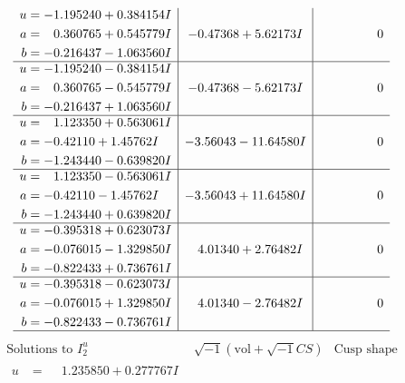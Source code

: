 \documentclass[1p]{elsarticle_modified}
\theoremstyle{definition}
\newcommand{\I}{\sqrt{-1}}
\begin{document}
$$\begin{array}{c|c|c}
\begin{aligned}
u &= -1.195240 + 0.384154 I \\
a &= \phantom{-}0.360765 + 0.545779 I \\
b &= -0.216437 - 1.063560 I\end{aligned}
 & -0.47368 + 5.62173 I & \phantom{-0.000000 } 0 \\ \hline\begin{aligned}
u &= -1.195240 - 0.384154 I \\
a &= \phantom{-}0.360765 - 0.545779 I \\
b &= -0.216437 + 1.063560 I\end{aligned}
 & -0.47368 - 5.62173 I & \phantom{-0.000000 } 0 \\ \hline\begin{aligned}
u &= \phantom{-}1.123350 + 0.563061 I \\
a &= -0.42110 + 1.45762 I \\
b &= -1.243440 - 0.639820 I\end{aligned}
 & -3.56043 - 11.64580 I & \phantom{-0.000000 } 0 \\ \hline\begin{aligned}
u &= \phantom{-}1.123350 - 0.563061 I \\
a &= -0.42110 - 1.45762 I \\
b &= -1.243440 + 0.639820 I\end{aligned}
 & -3.56043 + 11.64580 I & \phantom{-0.000000 } 0 \\ \hline\begin{aligned}
u &= -0.395318 + 0.623073 I \\
a &= -0.076015 - 1.329850 I \\
b &= -0.822433 + 0.736761 I\end{aligned}
 & \phantom{-}4.01340 + 2.76482 I & \phantom{-0.000000 } 0 \\ \hline\begin{aligned}
u &= -0.395318 - 0.623073 I \\
a &= -0.076015 + 1.329850 I \\
b &= -0.822433 - 0.736761 I\end{aligned}
 & \phantom{-}4.01340 - 2.76482 I & \phantom{-0.000000 } 0\\
 \hline 
 \end{array}$$\newpage$$\begin{array}{c|c|c}  
\text{Solutions to }I^u_{2}& \I (\text{vol} + \sqrt{-1}CS) & \text{Cusp shape}\\
 \hline 
\begin{aligned}
u &= \phantom{-}1.235850 + 0.277767 I \\

\end{aligned}
\end{array}$$
\end{document}
